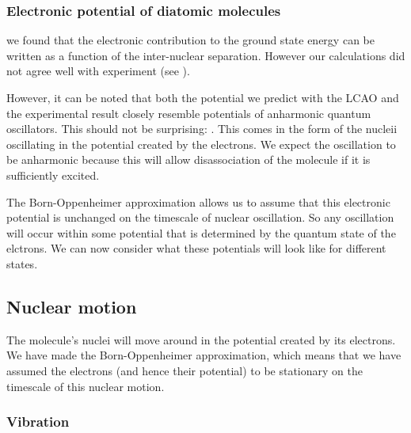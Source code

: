 \subsubsection{Electronic potential of diatomic molecules}

 we found that the electronic contribution to the ground state energy
can be written as a function of the inter-nuclear separation. However our
calculations did not agree well with experiment (see
).

However, it can be noted that both the potential we predict with the LCAO and
the experimental result closely resemble potentials of anharmonic quantum
oscillators. This should not be surprising: . This comes in the form of the
nucleii oscillating in the potential created by the electrons.  We expect the oscillation to be anharmonic
because this will allow disassociation of the molecule if it is sufficiently
excited.

The Born-Oppenheimer approximation allows us to assume that this electronic
potential is unchanged on the timescale of nuclear oscillation. So any
oscillation will occur within some potential that is determined by the quantum
state of the elctrons. We can now consider what these potentials will look like
for different states.

%


\subsection{Nuclear motion}

The molecule's nuclei will move around in the potential created by its
electrons. We have made the Born-Oppenheimer approximation, which means that we
have assumed the electrons (and hence their potential) to be stationary on the
timescale of this nuclear motion.

\subsubsection{Vibration}

